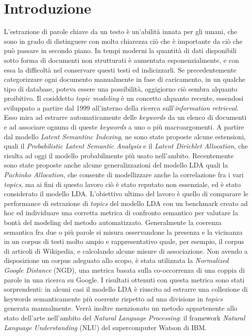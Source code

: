 \documentclass[]{article}
\begin{document}
\section{Introduzione}
L'estrazione di parole chiave da un testo è un'abilit\`a innata per gli umani, che sono in grado di distinguere con molta chiarezza ciò che è importante da ciò che può passare in secondo piano. \newline
In tempi moderni la quantità di dati disponibili sotto forma di documenti non strutturati è aumentata esponenzialmente, e con essa la difficoltà nel conservare questi testi ed indicizzarli. Se precedentemente categorizzare ogni documento manualmente in fase di caricamento, in un qualche tipo di database, poteva essere una possibilità, oggigiorno ciò sembra alquanto proibitivo. \newline
Il  cosiddetto \textit{topic modeling} è un concetto alquanto recente, essendosi sviluppato a partire dal 1999 all'interno della ricerca sull'\textit{information retrieval}. \cite{1999}
Esso mira ad estrarre automaticamente delle \textit{keywords} da un elenco di documenti e ad associare ognuna di queste \textit{keywords} a uno o più macroargomenti. \newline
A partire dal modello \textit{Latent Semantinc Indexing}, ne sono state proposte alcune estensioni, quali il \textit{Probabilistic Latent Semantic Analysis} e il \textit{Latent Dirichlet Allocation}, che risulta ad oggi il modello probabilmente più usato nell'ambito. Recentemente sono state proposte anche alcune generalizzazioni del modello LDA quali la \textit{Pachinko Allocation}, che consente di modellizzare anche la correlazione fra i vari \textit{topics}, ma ai fini di questo lavoro ciò è stato reputato non essenziale, ed è stato considerato il modello LDA.  \cite{survey} \newline
L'obiettivo ultimo del lavoro è quello di comparare le performance di estrazione di \textit{topics} del modello LDA con un benchmark creato ad hoc ed individuare una corretta metrica di confronto semantico per valutare la bontà del modeling del metodo automatizzato. \newline
Generalmente la coerenza semantica fra due o più parole si misura osservandone la presenza e la vicinanza in un corpus di testi molto ampio e rappresentativo quale, per esempio, il corpus di articoli di Wikipedia, e calcolando alcune misure di associazione.\cite{ReadingTeaLeaves}
Non avendo a disposizione un corpus adeguato allo scopo, è stata utilizzata la \textit{Normalized Google Distance} (NGD), una metrica basata sulla co-occorrenza di una coppia di parole in una ricerca su Google. \cite{NGD}
I risultati ottenuti con questa metrica sono stati sorprendenti: in alcuni casi il modello LDA è riuscito ad estrarre una collezione di keywords semanticamente più coerente rispetto ad una divisione in \textit{topics} generata manualmente.
Verrà inoltre menzionato un metodo appartenente allo stato dell'arte nell'ambito del \textit{Natural Language Processing}: il framework \textit{Natural Language Understanding} (NLU) del supercomputer Watson di IBM. \cite{watson}
\end{document}
